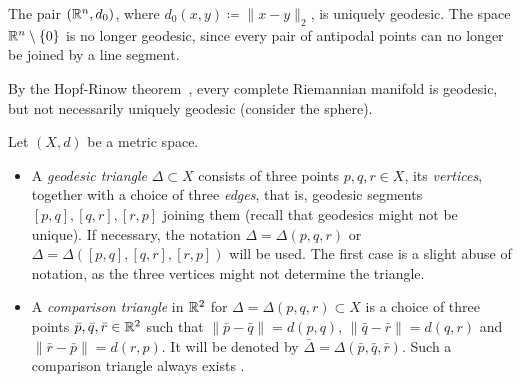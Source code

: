 \begin{bsp} The pair \((\mathbb{R}^n, d_0)\), where \(d_0(x,y) \coloneqq \|x - y\|_2\), is uniquely geodesic. The space \(\mathbb{R}^n \setminus \{0\}\) is no longer geodesic, since every pair of antipodal points can no longer be joined by a line segment.
\end{bsp}

\begin{bsp} By the Hopf-Rinow theorem\ \cite{hopf-rinow}, every complete Riemannian manifold is geodesic, but not necessarily uniquely geodesic (consider the sphere).
\end{bsp}

\begin{defin}
  Let \((X,d)\) be a metric space.\vspace{-6pt}
  \begin{itemize}
  \item A \emph{geodesic triangle} \(\Delta \subset X\) consists of three points \(p,q,r \in X\), its \emph{vertices}, together with a choice of three \emph{edges}, that is, geodesic segments \([p,q], [q,r], [r, p]\) joining them (recall that geodesics might not be unique). If necessary, the notation \(\Delta = \Delta(p,q,r)\) or \(\Delta = \Delta([p,q], [q,r], [r,p])\) will be used. The first case is a slight abuse of notation, as the three vertices might not determine the triangle.
  \item A \emph{comparison triangle} in \(\mathbb{R}^2\) for \(\Delta = \Delta(p,q,r) \subset X\) is a choice of three points \(\bar p, \bar q, \bar r \in \mathbb{R}^2\) such that \(\|\bar p- \bar q\| = d(p, q)\), \(\|\bar q- \bar r\| = d(q, r)\) and \(\|\bar r- \bar p\| = d(r, p)\). It will be denoted by \(\bar \Delta = \Delta(\bar p, \bar q, \bar r)\). Such a comparison triangle always exists \cite[c.\,f.][Sec.\ I.2]{MR1744486}.
  \end{itemize}
\end{defin}

